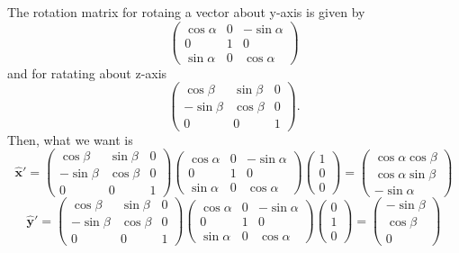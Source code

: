 The rotation matrix for rotaing a vector about y-axis is given by
\begin{equation}
  \begin{pmatrix} 
    \cos\alpha & 0 & -\sin\alpha \\ 
    0 & 1 & 0 \\
    \sin\alpha & 0 & \cos\alpha 
  \end{pmatrix}
\end{equation}
and for ratating about z-axis
\begin{equation}
  \begin{pmatrix} 
    \cos\beta & \sin\beta & 0 \\ 
    -\sin\beta & \cos\beta & 0 \\
    0 & 0 & 1 
  \end{pmatrix}.
\end{equation}
Then, what we want is
\begin{equation}
  \mathbf{\hat{x}}' = 
  \begin{pmatrix} 
    \cos\beta & \sin\beta & 0 \\ 
    -\sin\beta & \cos\beta & 0 \\
    0 & 0 & 1 
  \end{pmatrix}
  \begin{pmatrix} 
    \cos\alpha & 0 & -\sin\alpha \\ 
    0 & 1 & 0 \\
    \sin\alpha & 0 & \cos\alpha 
  \end{pmatrix}
  \begin{pmatrix}
    1 \\
    0 \\
    0
  \end{pmatrix}
  = 
  \begin{pmatrix}
    \cos\alpha\cos\beta \\
    \cos\alpha\sin\beta \\
    -\sin\alpha
  \end{pmatrix}
\end{equation}
\begin{equation}
  \mathbf{\hat{y}}' = 
  \begin{pmatrix} 
    \cos\beta & \sin\beta & 0 \\ 
    -\sin\beta & \cos\beta & 0 \\
    0 & 0 & 1 
  \end{pmatrix}
  \begin{pmatrix} 
    \cos\alpha & 0 & -\sin\alpha \\ 
    0 & 1 & 0 \\
    \sin\alpha & 0 & \cos\alpha 
  \end{pmatrix}
  \begin{pmatrix}
    0 \\
    1 \\
    0
  \end{pmatrix}
  =
  \begin{pmatrix}
    -\sin\beta \\
    \cos\beta \\
    0
  \end{pmatrix}
\end{equation}
